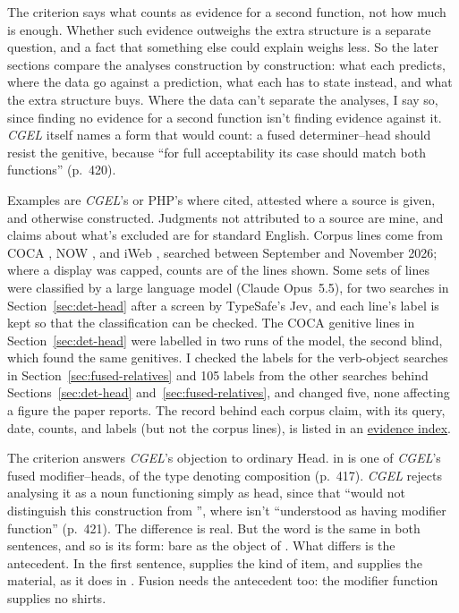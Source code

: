 The criterion says what counts as evidence for a second function, not how much is enough. Whether such evidence outweighs the extra structure is a separate question, and a fact that something else could explain weighs less. So the later sections compare the analyses construction by construction: what each predicts, where the data go against a prediction, what each has to state instead, and what the extra structure buys. Where the data can't separate the analyses, I say so, since finding no evidence for a second function isn't finding evidence against it. \textit{CGEL} itself names a form that would count: a fused determiner--head should resist the genitive, because \enquote{for full acceptability its case should match both functions} (p.~420).

Examples are \textit{CGEL}'s or PHP's where cited, attested where a source is given, and otherwise constructed. Judgments not attributed to a source are mine, and claims about what's excluded are for standard English. Corpus lines come from COCA \citep{davies2008cocaonline}, NOW \citep{davies2016now}, and iWeb \citep{davies2018iweb}, searched between September and November 2026; where a display was capped, counts are of the lines shown. Some sets of lines were classified by a large language model (Claude Opus~5.5), for two searches in Section~\ref{sec:det-head} after a screen by TypeSafe's Jev, and each line's label is kept so that the classification can be checked. The COCA genitive lines in Section~\ref{sec:det-head} were labelled in two runs of the model, the second blind, which found the same genitives. I checked the labels for the verb-object searches in Section~\ref{sec:fused-relatives} and 105 labels from the other searches behind Sections~\ref{sec:det-head} and~\ref{sec:fused-relatives}, and changed five, none affecting a figure the paper reports. The record behind each corpus claim, with its query, date, counts, and labels (but not the corpus lines), is listed in an \href{https://github.com/BrettRey/fusion-of-functions-revisited/blob/master/EVIDENCE.md}{evidence index}.

The criterion answers \textit{CGEL}'s objection to ordinary Head.  in  is one of \textit{CGEL}'s fused modifier--heads, of the type denoting composition (p.~417). \textit{CGEL} rejects analysing it as a noun functioning simply as head, since that \enquote{would not distinguish this construction from }, where  isn't \enquote{understood as having modifier function} (p.~421). The difference is real. But the word is the same in both sentences, and so is its form: bare  as the object of . What differs is the antecedent. In the first sentence,  supplies the kind of item, and  supplies the material, as it does in . Fusion needs the antecedent too: the modifier function supplies no shirts.

